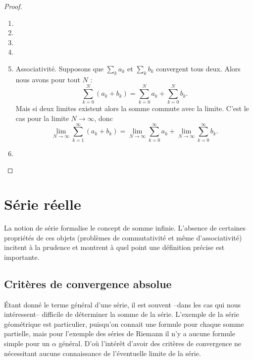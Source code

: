 \begin{proof}
    
    \begin{enumerate}
        \item
            
  \item
  \item 
  \item
\item 
Associativité. Supposons que \( \sum_ka_k\) et \( \sum_kb_k\) convergent tous deux. Alors nous avons pour tout \( N\) :
\begin{equation}
    \sum_{k=0}^N(a_k+b_k)=\sum_{k=0}^Na_k+\sum_{k=0}^Nb_k.
\end{equation}
Mais si deux limites existent alors la somme commute avec la limite. C'est le cas pour la limite \( N\to \infty\), donc
\begin{equation}
    \lim_{N\to \infty} \sum_{k=1}^{\infty}(a_k+b_k)=\lim_{N\to \infty} \sum_{k=0}^{\infty}a_k+\lim_{N\to \infty} \sum_{k=0}^{\infty}b_k.
\end{equation}
\item
    \end{enumerate}
\end{proof}

\section{Série réelle}
\label{secseries}

La notion de série formalise le concept de somme infinie. L'absence de certaines propriétés de ces objets (problèmes de commutativité et même d'associativité) incitent à la prudence et montrent à quel point une définition précise est importante. 


\subsection{Critères de convergence absolue}

Étant donné le terme général d'une série, il est souvent --dans les cas qui nous intéressent-- difficile de déterminer la somme de la série. L'exemple de la série géométrique est particulier, puisqu'on connait une formule pour chaque somme partielle, mais pour l'exemple des séries de Riemann il n'y a aucune formule simple pour un $\alpha$ général. D'où l'intérêt d'avoir des critères de convergence ne nécessitant aucune connaissance de l'éventuelle limite de la série.

